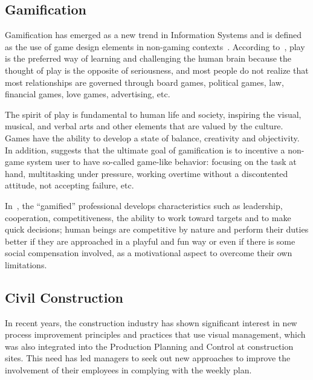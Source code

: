 
\subsection{Gamification}
Gamification has emerged as a new trend in Information Systems and is defined as the use of game design elements in non-gaming contexts~\cite{Deterding}.
According to~\cite{Smith}, play is the preferred way of learning and challenging the human brain because the thought of play is the opposite of seriousness, and most people do not realize that most relationships are governed through board games, political games, law, financial games, love games, advertising, etc.

The spirit of play is fundamental to human life and society, inspiring the visual, musical, and verbal arts and other elements that are valued by the culture. Games have the ability to develop a state of balance, creativity and objectivity. In addition, \cite{Liu} suggests that the ultimate goal of gamification is to incentive a non-game system user to have so-called game-like behavior: focusing on the task at hand, multitasking under pressure, working overtime without a discontented attitude, not accepting failure, etc.

In~\cite{Zich}, the ``gamified'' professional develops characteristics such as leadership, cooperation, competitiveness, the ability to work toward targets and to make quick decisions; human beings are competitive by nature and perform their duties better if they are approached in a playful and fun way or even if there is some social compensation involved, as a motivational aspect to overcome their own limitations.

\subsection{Civil Construction}
In recent years, the construction industry has shown significant interest in new process improvement principles and practices that use visual management, which was also integrated into the Production Planning and Control at construction sites. This need has led managers to seek out new approaches to improve the involvement of their employees in complying with the weekly plan.%

